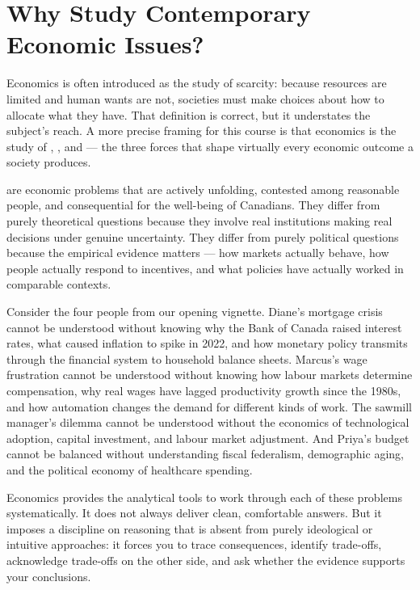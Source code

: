 \section{Why Study Contemporary Economic Issues?}

Economics is often introduced as the study of scarcity: because resources are
limited and human wants are not, societies must make choices about how to
allocate what they have. That definition is correct, but it understates the
subject's reach. A more precise framing for this course is that economics is
the study of , , and  --- the three forces that shape virtually every economic outcome
a society produces.

 are economic problems that are actively
unfolding, contested among reasonable people, and consequential for the
well-being of Canadians. They differ from purely theoretical questions
because they involve real institutions making real decisions under genuine
uncertainty. They differ from purely political questions because the
empirical evidence matters --- how markets actually behave, how people
actually respond to incentives, and what policies have actually worked
in comparable contexts.

Consider the four people from our opening vignette. Diane's mortgage crisis
cannot be understood without knowing why the Bank of Canada raised interest
rates, what caused inflation to spike in 2022, and how monetary policy
transmits through the financial system to household balance sheets. Marcus's
wage frustration cannot be understood without knowing how labour markets
determine compensation, why real wages have lagged productivity growth since
the 1980s, and how automation changes the demand for different kinds of work.
The sawmill manager's dilemma cannot be understood without the economics of
technological adoption, capital investment, and labour market adjustment. And
Priya's budget cannot be balanced without understanding fiscal federalism,
demographic aging, and the political economy of healthcare spending.

Economics provides the analytical tools to work through each of these problems
systematically. It does not always deliver clean, comfortable answers. But it
imposes a discipline on reasoning that is absent from purely ideological or
intuitive approaches: it forces you to trace consequences, identify trade-offs,
acknowledge trade-offs on the other side, and ask whether the evidence
supports your conclusions.

